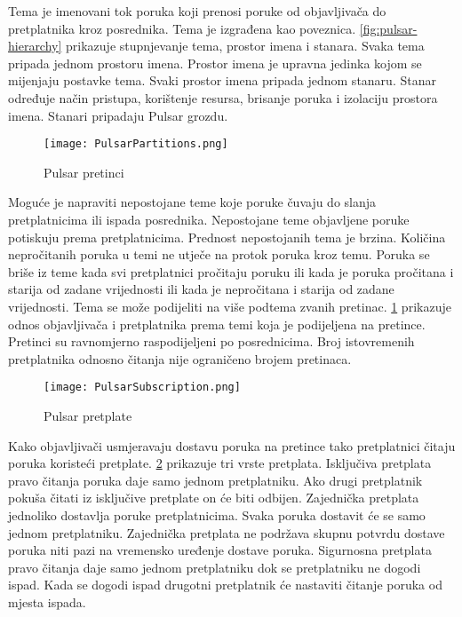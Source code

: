 \documentclass[utf8, diplomski, lmodern, numeric]{fer}
\begin{document}
Tema je imenovani tok poruka koji prenosi poruke od objavljivača do pretplatnika kroz posrednika. Tema je izgrađena kao poveznica. \ref{fig:pulsar-hierarchy} prikazuje stupnjevanje tema, prostor imena i stanara. Svaka tema pripada jednom prostoru imena. Prostor imena je upravna jedinka kojom se mijenjaju postavke tema. Svaki prostor imena pripada jednom stanaru. Stanar određuje način pristupa, korištenje resursa, brisanje poruka i izolaciju prostora imena. Stanari pripadaju Pulsar grozdu.

\begin{figure}[H]
    \centering
    \texttt{[image: PulsarPartitions.png]}
    \caption{Pulsar pretinci}
    \label{fig:pulsar-partitions}
\end{figure}

Moguće je napraviti nepostojane teme koje poruke čuvaju do slanja pretplatnicima ili ispada posrednika. Nepostojane teme objavljene poruke potiskuju prema pretplatnicima. Prednost nepostojanih tema je brzina. Količina nepročitanih poruka u temi ne utječe na protok poruka kroz temu. Poruka se briše iz teme kada svi pretplatnici pročitaju poruku ili kada je poruka pročitana i starija od zadane vrijednosti ili kada je nepročitana i starija od zadane vrijednosti. Tema se može podijeliti na više podtema zvanih pretinac. \ref{fig:pulsar-partitions} prikazuje odnos objavljivača i pretplatnika prema temi koja je podijeljena na pretince. Pretinci su ravnomjerno raspodijeljeni po posrednicima. Broj istovremenih pretplatnika odnosno čitanja nije ograničeno brojem pretinaca.

\begin{figure}[H]
    \centering
    \texttt{[image: PulsarSubscription.png]}
    \caption{Pulsar pretplate}
    \label{fig:pulsar-subscription}
\end{figure}

Kako objavljivači usmjeravaju dostavu poruka na pretince tako pretplatnici čitaju poruka koristeći pretplate. \ref{fig:pulsar-subscription} prikazuje tri vrste pretplata. Isključiva pretplata pravo čitanja poruka daje samo jednom pretplatniku. Ako drugi pretplatnik pokuša čitati iz isključive pretplate on će biti odbijen. Zajednička pretplata jednoliko dostavlja poruke pretplatnicima. Svaka poruka dostavit će se samo jednom pretplatniku. Zajednička pretplata ne podržava skupnu potvrdu dostave poruka niti pazi na vremensko uređenje dostave poruka. Sigurnosna pretplata pravo čitanja daje samo jednom pretplatniku dok se pretplatniku ne dogodi ispad. Kada se dogodi ispad drugotni pretplatnik će nastaviti čitanje poruka od mjesta ispada.
\end{document}
